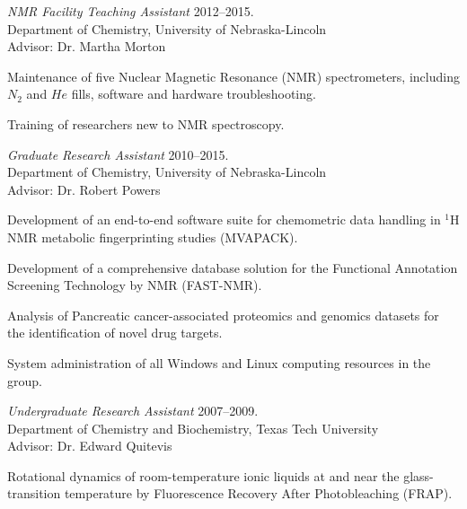\documentclass[letterpaper]{article}
\renewenvironment{itemize}{
  \begin{list}{}{
    \setlength{\leftmargin}{1.5em}
  }
}{
  \end{list}
}
\begin{document}
\begin{itemize}
\setlength{\itemsep}{16pt}
\item{
  {\it NMR Facility Teaching Assistant}
  \hfill 2012--2015. \\
  Department of Chemistry, University of Nebraska-Lincoln \\
  Advisor: Dr. Martha Morton
  \begin{enumerate*}
    \item Maintenance of five Nuclear Magnetic Resonance (NMR) spectrometers,
      including $N_2$ and $He$ fills, software and hardware troubleshooting.
    \item Training of researchers new to NMR spectroscopy.
  \end{enumerate*}
}

\pagebreak %
\item{
  {\it Graduate Research Assistant}
  \hfill 2010--2015. \\
  Department of Chemistry, University of Nebraska-Lincoln \\
  Advisor: Dr. Robert Powers
  \begin{enumerate*}
    \item Development of an end-to-end software suite for chemometric data
      handling in $^1$H NMR metabolic fingerprinting studies (MVAPACK).
    \item Development of a comprehensive database solution for the Functional
      Annotation Screening Technology by NMR (FAST-NMR).
    \item Analysis of Pancreatic cancer-associated proteomics and genomics
      datasets for the identification of novel drug targets.
    \item System administration of all Windows and Linux computing resources
      in the group.
  \end{enumerate*}
}

\item{
  {\it Undergraduate Research Assistant}
  \hfill 2007--2009. \\
  Department of Chemistry and Biochemistry, Texas Tech University \\
  {\setlength{\topmargin}{0pt} Advisor: Dr. Edward Quitevis}
  \begin{enumerate*}
    \item Rotational dynamics of room-temperature ionic liquids at and near
      the glass-transition temperature by Fluorescence Recovery After
      Photobleaching (FRAP).
  \end{enumerate*}
}
\end{itemize}
\end{document}
